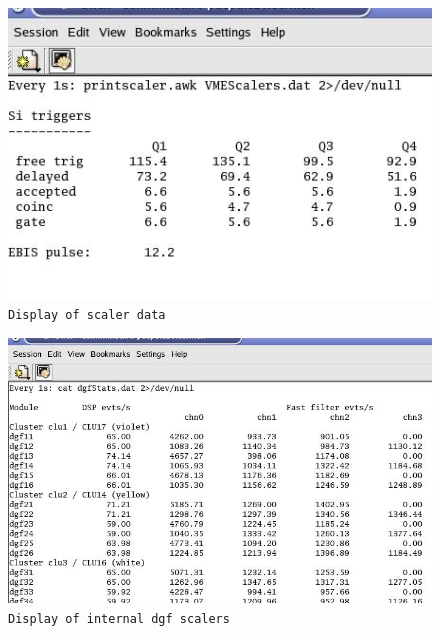 \documentclass[10pt]{article}
\begin{document}
\begin{center}
\begin{minipage}[t]{.6\linewidth}
\begin{figure}[H]
\centerline{\includegraphics[width=\linewidth]{ScalerPanel.jpg}}
\caption{\texttt{Display of scaler data}}
\label{ScalerPanel}
\end{figure}
\end{minipage}
\end{center}
\begin{center}
\begin{minipage}[t]{.8\linewidth}
\begin{figure}[H]
\centerline{\includegraphics[width=\linewidth]{DgfScalerPanel.jpg}}
\caption{\texttt{Display of internal dgf scalers}}
\label{DgfScalerPanel}
\end{figure}
\end{minipage}
\end{center}
\end{document}
